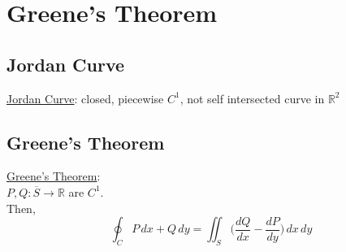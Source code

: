 \documentclass[12pt]{article}
\newcommand{\BR}{\mathbb R}
\begin{document}
\section*{Greene's Theorem}
  \subsection*{Jordan Curve}
    \underline{Jordan Curve}: closed, piecewise $C^1$, not self intersected curve in $\BR^2$ \\
  \subsection*{Greene's Theorem}
    \underline{Greene's Theorem}: \\
    $P,Q:\overline{S}\rightarrow\BR$ are $C^1$. \\
    Then, \\
    \[ \oint_CP\,dx+Q\,dy = \iint_S\big(\frac{dQ}{dx}-\frac{dP}{dy}\big)\,dx\,dy \]
\end{document}
